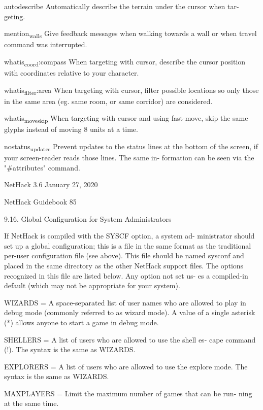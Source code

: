 \documentclass[11pt]{article}
\begin{document}
autodescribe
 Automatically describe the terrain under the cursor when tar-
 geting.

mention\textsubscript{walls}
 Give feedback messages when walking towards a wall or when
 travel command was interrupted.

whatis\textsubscript{coord}:compass
 When targeting with cursor, describe the cursor position with
 coordinates relative to your character.

whatis\textsubscript{filter}:area
 When targeting with cursor, filter possible locations so only
 those in the same area (eg. same room, or same corridor) are
 considered.

whatis\textsubscript{moveskip}
 When targeting with cursor and using fast-move, skip the same
 glyphs instead of moving 8 units at a time.

nostatus\textsubscript{updates}
 Prevent updates to the status lines at the bottom of the
 screen, if your screen-reader reads those lines. The same in-
 formation can be seen via the "\#attributes" command.




NetHack 3.6                   January 27, 2020





NetHack Guidebook                       85



9.16. Global Configuration for System Administrators

   If NetHack is compiled with the SYSCF option, a system ad-
ministrator should set up a global configuration; this is a file
in the same format as the traditional per-user configuration file
(see above). This file should be named sysconf and placed in the
same directory as the other NetHack support files.  The options
recognized in this file are listed below. Any option not set us-
es a compiled-in default (which may not be appropriate for your
system).

WIZARDS = A space-separated list of user names who are allowed
to play in debug mode (commonly referred to as wizard mode). A
value of a single asterisk (*) allows anyone to start a game in
debug mode.

SHELLERS = A list of users who are allowed to use the shell es-
cape command (!). The syntax is the same as WIZARDS.

EXPLORERS = A list of users who are allowed to use the explore
mode. The syntax is the same as WIZARDS.

MAXPLAYERS = Limit the maximum number of games that can be run-
ning at the same time.
\end{document}
